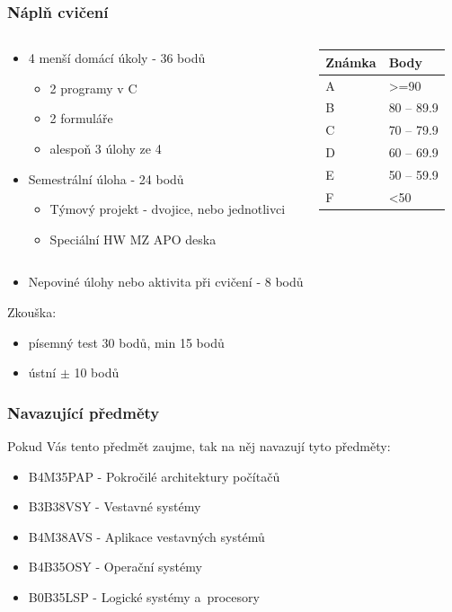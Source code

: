 \documentclass{beamer}
\begin{document}
\begin{frame}
\frametitle{Náplň cvičení}

\begin{columns}
\begin{column}{0.6\textwidth}
\begin{itemize}
\item 4 menší domácí úkoly - 36 bodů
\begin{itemize}
\item 2 programy v C
\item 2 formuláře
\item alespoň 3 úlohy ze 4
\end{itemize}
\item Semestrální úloha - 24 bodů
\begin{itemize}
\item Týmový projekt - dvojice, nebo jednotlivci
\item Speciální HW MZ APO deska
\end{itemize}
\end{itemize}
\end{column}
\begin{column}{0.35\textwidth}  
   \begin{tabular}{|l|l|}\hline
   Známka & Body\\ \hline
   A & >=90\\ \hline
   B & 80 -- 89.9\\ \hline
   C & 70 -- 79.9\\ \hline
   D & 60 -- 69.9\\ \hline
   E & 50 -- 59.9\\ \hline
   F & <50\\ \hline
   \end{tabular}
\end{column}
\end{columns}
\begin{itemize}
\item Nepoviné úlohy nebo aktivita při cvičení - 8 bodů
\end{itemize}
\bigskip
Zkouška: 
\begin{itemize}
\item písemný test 30 bodů, min 15 bodů
\item ústní $\pm$ 10 bodů    
\end{itemize}

\end{frame}


\begin{frame}
\frametitle{Navazující předměty}
Pokud Vás tento předmět zaujme, tak na něj navazují tyto předměty:
\begin{itemize}
\item B4M35PAP - Pokročilé architektury počítačů
\item B3B38VSY - Vestavné systémy
\item B4M38AVS - Aplikace vestavných systémů
\item B4B35OSY - Operační systémy
\item B0B35LSP - Logické systémy a procesory
\end{itemize}
\end{frame}
\end{document}
